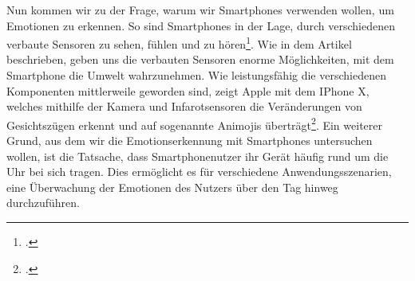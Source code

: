 Nun kommen wir zu der Frage, warum wir Smartphones verwenden wollen, um Emotionen zu erkennen. So sind Smartphones in der Lage, durch verschiedenen verbaute Sensoren zu sehen, fühlen und zu hören\footcite[Vgl.][S. 1 Abs. 2]{Bie14}. Wie in dem Artikel beschrieben, geben uns die verbauten Sensoren enorme Möglichkeiten, mit dem Smartphone die Umwelt wahrzunehmen. Wie leistungsfähig die verschiedenen Komponenten mittlerweile geworden sind, zeigt Apple mit dem IPhone X, welches mithilfe der Kamera und Infarotsensoren die Veränderungen von Gesichtszügen erkennt und auf sogenannte Animojis überträgt\footcite[Vgl. ][Animoji: So funktioniert es]{Com17}. Ein weiterer Grund, aus dem wir die Emotionserkennung mit Smartphones untersuchen wollen, ist die Tatsache, dass Smartphonenutzer ihr Gerät häufig rund um die Uhr bei sich tragen. Dies ermöglicht es für verschiedene Anwendungsszenarien, eine Überwachung der Emotionen des Nutzers über den Tag hinweg durchzuführen.
